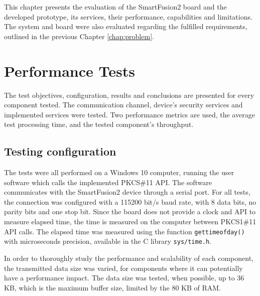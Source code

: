 \cleardoublepage
\label{chap:evaluation}

This chapter presents the evaluation of the SmartFusion2 board and the developed prototype, its services, their performance, capabilities and limitations. The system and board were also evaluated regarding the fulfilled requirements, outlined in the previous Chapter \ref{chap:problem}.

\section{Performance Tests}\label{chap:evaluation:performance}

The test objectives, configuration, results and conclusions are presented for every component tested.
The communication channel, device's security services and implemented services were tested.
Two performance metrics are used, the average test processing time, and the tested component's throughput.

\subsection{Testing configuration}\label{chap:evaluation:performance:config}

The tests were all performed on a Windows 10 computer, running the user software which calls the implemented PKCS\#11 API. The software communicates with the SmartFusion2 device through a serial port. For all tests, the connection was configured with a 115200 bit/s baud rate, with 8 data bits, no parity bits and one stop bit.
Since the board does not provide a clock and API to measure elapsed time, the time is measured on the computer between PKCS1\#11 API calls.
The elapsed time was measured using the function \texttt{gettimeofday()} with microseconds precision, available in the C library \texttt{sys/time.h}.

In order to thoroughly study the performance and scalability of each component, the transmitted data size was varied, for components where it can potentially have a performance impact. The data size was tested, when possible, up to 36 KB, which is the maximum buffer size, limited by the 80 KB of RAM.

